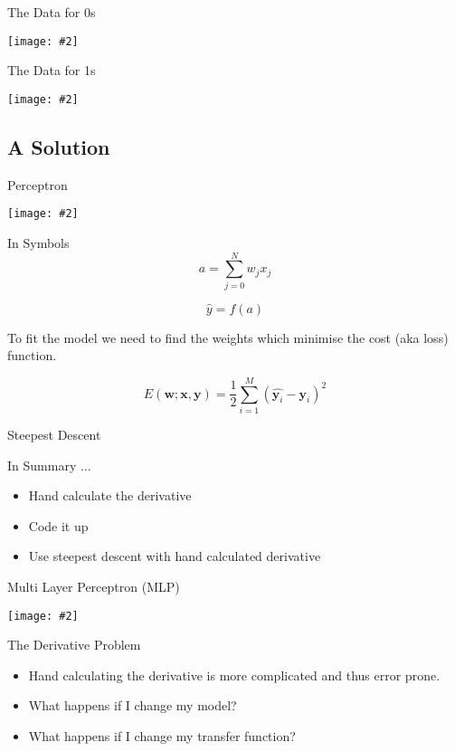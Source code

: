 \documentclass{beamer}
\newcommand {\framedgraphic}[2] {
    \begin{frame}{#1}
        \begin{center}
            \texttt{[image: \#2]}
        \end{center}
    \end{frame}
}
\begin{document}
\framedgraphic{The Data for 0s}{diagrams/mnist_train0.jpg}

\framedgraphic{The Data for 1s}{diagrams/mnist_train1.jpg}

\subsection{A Solution}

\framedgraphic{Perceptron}{diagrams/Fita1.png}

\begin{frame}[fragile]{In Symbols}
$$
a = \sum_{j=0}^{N} w_{j} x_j
$$

$$
\hat{y} = f(a)
$$

To fit the model we need to find the weights which minimise the cost
(aka loss) function.

$$
E(\boldsymbol{w}; \boldsymbol{x}, \boldsymbol{y}) =
\frac{1}{2}\sum_{i=1}^M(\hat{\boldsymbol{y}_i} - \boldsymbol{y}_i)^2
$$
\end{frame}

\begin{frame}[fragile]{Steepest Descent}

\end{frame}

\begin{frame}[fragile]{In Summary $\ldots$}
\begin{itemize}
\item Hand calculate the derivative
\item Code it up
\item Use steepest descent with hand calculated derivative
\end{itemize}
\end{frame}

\framedgraphic{Multi Layer Perceptron (MLP)}{diagrams/Fita2.png}

\begin{frame}[fragile]{The Derivative Problem}
\begin{itemize}
\item Hand calculating the derivative is more complicated and thus error prone.
\item What happens if I change my model?
\item What happens if I change my transfer function?
\end{itemize}
\end{frame}
\end{document}
